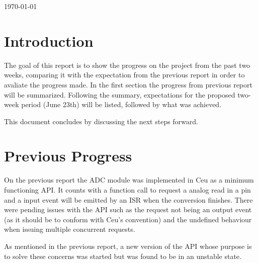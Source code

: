 \documentclass{article}
\begin{document}
\begin{titlepage}

{\large \today}\\[3cm] %


 

\vfill %

\end{titlepage}

\tableofcontents{}

\newpage

\section{Introduction}	


\tab The goal of this report is to show the progress on the project from the past two weeks, comparing it with the expectation from the previous report in order to avaliate the progress made. In the first section the progress from previous report will be summarized. Following the summary, expectations for the proposed two-week period (June 23th) will be listed, followed by what was achieved.
\par This document concludes by discussing the next steps forward.

\section{Previous Progress}
\tab On the previous report the ADC module was implemented in Ceu as a minimum functioning API. It counts with a function call to request a analog read in a pin and a input event will be emitted by an ISR when the conversion finishes. There were pending issues with the API such as the request not being an output event (as it should be to conform with Ceu's convention) and the undefined behaviour when issuing multiple concurrent requests.
\par As mentioned in the previous report, a new version of the API whose purpose is to solve these concerns was started but was found to be in an unstable state.
\end{document}
